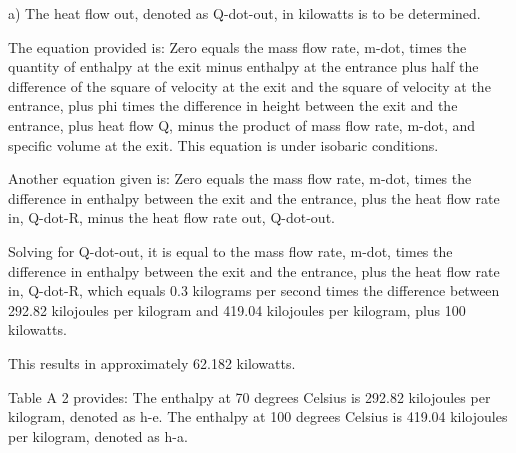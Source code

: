 a) The heat flow out, denoted as Q-dot-out, in kilowatts is to be determined.

The equation provided is:
Zero equals the mass flow rate, m-dot, times the quantity of enthalpy at the exit minus enthalpy at the entrance plus half the difference of the square of velocity at the exit and the square of velocity at the entrance, plus phi times the difference in height between the exit and the entrance, plus heat flow Q, minus the product of mass flow rate, m-dot, and specific volume at the exit. This equation is under isobaric conditions.

Another equation given is:
Zero equals the mass flow rate, m-dot, times the difference in enthalpy between the exit and the entrance, plus the heat flow rate in, Q-dot-R, minus the heat flow rate out, Q-dot-out.

Solving for Q-dot-out, it is equal to the mass flow rate, m-dot, times the difference in enthalpy between the exit and the entrance, plus the heat flow rate in, Q-dot-R, which equals 0.3 kilograms per second times the difference between 292.82 kilojoules per kilogram and 419.04 kilojoules per kilogram, plus 100 kilowatts.

This results in approximately 62.182 kilowatts.

Table A 2 provides:
The enthalpy at 70 degrees Celsius is 292.82 kilojoules per kilogram, denoted as h-e.
The enthalpy at 100 degrees Celsius is 419.04 kilojoules per kilogram, denoted as h-a.